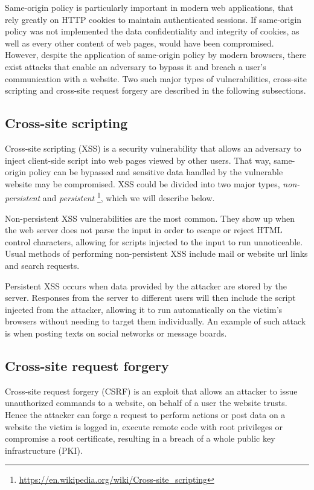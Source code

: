 Same-origin policy is particularly important in modern web applications, that
rely greatly on HTTP cookies to maintain authenticated sessions. If same-origin
policy was not implemented the data confidentiality and integrity of cookies, as
well as every other content of web pages, would have been compromised. However,
despite the application of same-origin policy by modern browsers, there exist
attacks that enable an adversary to bypass it and breach a user's communication
with a website. Two such major types of vulnerabilities, cross-site scripting
and cross-site request forgery are described in the following subsections.

\subsection{Cross-site scripting}

Cross-site scripting (XSS) is a security vulnerability that allows an adversary
to inject client-side script into web pages viewed by other users. That way,
same-origin policy can be bypassed and sensitive data handled by the vulnerable
website may be compromised. XSS could be divided into two major types,
\textit{non-persistent} and \textit{persistent}
\footnote{\url{https://en.wikipedia.org/wiki/Cross-site_scripting}}, which we
will describe below.

Non-persistent XSS vulnerabilities are the most common. They show up when the
web server does not parse the input in order to escape or reject HTML control
characters, allowing for scripts injected to the input to run unnoticeable.
Usual methods of performing non-persistent XSS include mail or website url links
and search requests.

Persistent XSS occurs when data provided by the attacker are stored by the
server. Responses from the server to different users will then include the
script injected from the attacker, allowing it to run automatically on the
victim's browsers without needing to target them individually. An example of
such attack is when posting texts on social networks or message boards.

\subsection{Cross-site request forgery}

Cross-site request forgery (CSRF) is an exploit that allows an attacker to issue
unauthorized commands to a website, on behalf of a user the website trusts.
Hence the attacker can forge a request to perform actions or post data on a
website the victim is logged in, execute remote code with root privileges or
compromise a root certificate, resulting in a breach of a whole public key
infrastructure (PKI).

